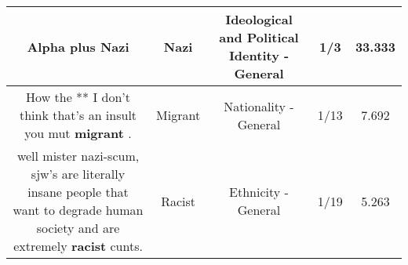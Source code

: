 \documentclass[11pt]{article}
\newlength\mylength
\begin{document}
\begin{center}
\begin{longtable}{|C{.65\mylength}|C{.30\mylength}|C{.12\mylength}|C{.12\mylength}|C{.12\mylength}|}
  \small Alpha plus Nazi\normalsize   & Nazi &  Ideological and Political Identity - General & 1/3 & 33.333 \\  \hline
  \small How the ** I don't think that's an insult you mut \textbf{migrant} .\normalsize   & Migrant & Nationality - General & 1/13 & 7.692 \\  \hline
  \small well mister nazi-scum, sjw's are literally insane people that want to degrade human society and are extremely \textbf{racist} cunts.\normalsize   & Racist & Ethnicity - General & 1/19 & 5.263 \\  \hline
  
\end{longtable}
\end{center}
\end{document}
